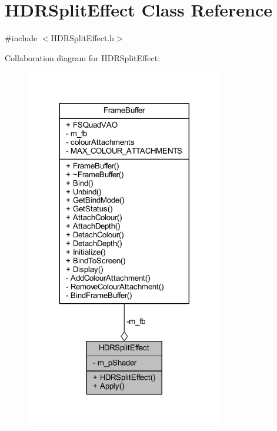 \hypertarget{class_h_d_r_split_effect}{}\section{H\+D\+R\+Split\+Effect Class Reference}
\label{class_h_d_r_split_effect}


{\ttfamily \#include $<$H\+D\+R\+Split\+Effect.\+h$>$}



Collaboration diagram for H\+D\+R\+Split\+Effect\+:\nopagebreak
\begin{figure}[H]
\begin{center}
\leavevmode
\includegraphics[width=245pt]{class_h_d_r_split_effect__coll__graph}
\end{center}
\end{figure}
